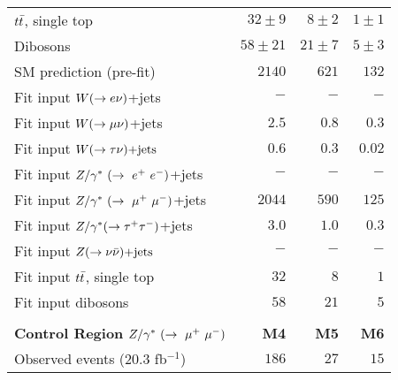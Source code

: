 \begin{table}[!ht]
\begin{center}
\begin{small}
\begin{tabular*}{\textwidth}{@{\extracolsep{\fill}}lrrr}
    $t\bar{t}$, single top               & $32 \pm 9$    & $8 \pm 2$      & $1 \pm 1$      \\
                                                                                         
    Dibosons                           & $58 \pm 21$   & $21 \pm 7$     & $5 \pm 3$        \\ \hline

    SM prediction (pre-fit)                & $2140$  & $621$  & $132$   \\                      
    \hline                                                         
                                                                   
    Fit input $W(\rightarrow e \nu)$+jets                  & $-$     & $-$    & $-$     \\
    Fit input $W(\rightarrow \mu \nu)$+jets                  & $2.5$   & $0.8$  & $0.3$   \\
    Fit input $W(\rightarrow \tau \nu)\text{+jets}$                  & $0.6$   & $0.3$  & $0.02$  \\
    Fit input $Z/\gamma^*~(\rightarrow~e^+~e^-)$+jets                  & $-$     & $-$    & $-$     \\
    Fit input $Z/\gamma^*~(\rightarrow~\mu^+~\mu^-)$+jets                  & $2044$  & $590$  & $125$   \\
    Fit input $Z/\gamma^*(\rightarrow \tau^+ \tau^-)$+jets                  & $3.0$   & $1.0$  & $0.3$   \\
    Fit input $Z(\rightarrow \nu \bar{\nu})\text{+jets}$                  & $-$     & $-$    & $-$     \\
    Fit input $t\bar{t}$, single top    & $32$    & $8$    & $1$     \\
    Fit input dibosons                & $58$    & $21$   & $5$     \\

    
    \hline \hline
                 & & & \\                                                          
    \hline 


{\bf Control Region} $Z/\gamma^*~(\rightarrow~\mu^+~\mu^-)$  & \textbf{M4} & \textbf{M5} & \textbf{M6}  \\
    Observed events  (20.3 fb${}^{-1}$)& $186$          & $27$           &  $15$            \\ \hline
                                                                                           

\end{tabular*}
\end{small}
\end{center}
\end{table}
